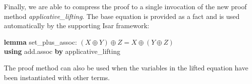 Finally, we are able to compress the proof to a single invocation of the new
proof method \emph{applicative\_lifting}.
The base equation is provided as a fact and is used automatically by the
supporting Isar framework:
\begin{isabelle}
\textbf{lemma} set\_plus\_assoc: $(X \oplus Y) \oplus Z = X \oplus (Y \oplus Z)$ \\
\textbf{using} add.assoc \textbf{by} applicative\_lifting
\end{isabelle}
The proof method can also be used when the variables in the lifted equation
have been instantiated with other terms.
